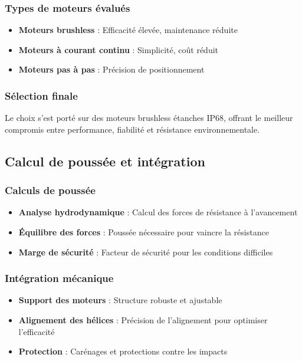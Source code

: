 {\subsubsection{Types de moteurs évalués}
\begin{itemize}
    \item \textbf{Moteurs brushless} : Efficacité élevée, maintenance réduite
    \item \textbf{Moteurs à courant continu} : Simplicité, coût réduit
    \item \textbf{Moteurs pas à pas} : Précision de positionnement
\end{itemize}

\subsubsection{Sélection finale}
Le choix s'est porté sur des moteurs brushless étanches IP68, offrant le meilleur compromis entre performance, fiabilité et résistance environnementale.

\subsection{Calcul de poussée et intégration}
\subsubsection{Calculs de poussée}
\begin{itemize}
    \item \textbf{Analyse hydrodynamique} : Calcul des forces de résistance à l'avancement
    \item \textbf{Équilibre des forces} : Poussée nécessaire pour vaincre la résistance
    \item \textbf{Marge de sécurité} : Facteur de sécurité pour les conditions difficiles
\end{itemize}

\subsubsection{Intégration mécanique}
\begin{itemize}
    \item \textbf{Support des moteurs} : Structure robuste et ajustable
    \item \textbf{Alignement des hélices} : Précision de l'alignement pour optimiser l'efficacité
    \item \textbf{Protection} : Carénages et protections contre les impacts
\end{itemize}

}
